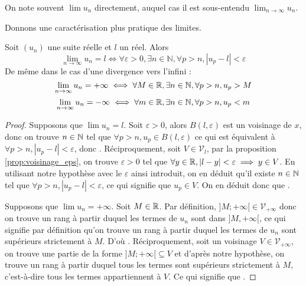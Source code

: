 \begin{rmk}
    On note souvent $\lim u_n$ directement, auquel cas il est sous-entendu $\lim_{n\to\infty} u_n$.
\end{rmk}

Donnons une caractérisation plus pratique des limites.

\begin{prop}
    Soit $(u_n)$ une suite réelle et $l$ un réel. Alors $$\lim_{n\to\infty}u_n = l \iff \forall \varepsilon > 0,\exists n\in\mathbb N,\forall p > n, |u_p-l| < \varepsilon$$
    De même dans le cas d'une divergence vers l'infini : $$\lim_{n\to\infty}u_n = +\infty \iff \forall M \in \mathbb R, \exists n\in\mathbb{N},\forall p > n, u_p > M$$
    $$\lim_{n\to\infty}u_n = -\infty \iff \forall m \in\mathbb R, \exists n\in\mathbb{N},\forall p > n, u_p < m$$
\end{prop}

\begin{proof}
    Supposons que $\lim  u_n = l$. Soit $\varepsilon > 0$, alors $B(l,\varepsilon)$ est un voisinage de $x$, donc on trouve $n\in \mathbb{N}$ tel que $\forall p > n, u_p \in B(l,\varepsilon)$ ce qui est équivalent à $\forall p > n, |u_p-l| < \varepsilon$, donc . Réciproquement, soit $V\in\mathcal V_l$, par la proposition \ref{prop:voisinage_eps}, on trouve $\varepsilon > 0$ tel que $\forall y\in\mathbb{R},|l-y| < \varepsilon \implies y \in V$. En utilisant notre hypothèse avec le $\varepsilon$ ainsi introduit, on en déduit qu'il existe $n\in\mathbb{N}$ tel que $\forall p > n, |u_p-l| < \varepsilon$, ce qui signifie que $u_p\in V$. On en déduit donc que .

    Supposons que $\lim u_n = +\infty$. Soit $M\in \mathbb{R}$. Par définition, $]M;+\infty[\in\mathcal V_{+\infty}$ donc on trouve un rang à partir duquel les termes de $u_n$ sont dans $]M,+\infty[$, ce qui signifie par définition qu'on trouve un rang à partir duquel les termes de $u_n$ sont supérieurs strictement à $M$. D'où . Réciproquement, soit un voisinage $V\in\mathcal V_{+\infty}$, on trouve une partie de la forme $]M;+\infty[\subseteq V$ et d'après notre hypothèse, on trouve un rang à partir duquel tous les termes sont supérieurs strictement à $M$, c'est-à-dire tous les termes appartiennent à $V$. Ce qui signifie que .
\end{proof}

